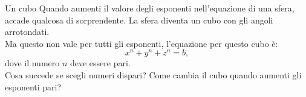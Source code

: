 \begin{surferPage}[Cubo]{Un cubo}
Quando aumenti il valore degli esponenti nell'equazione di una sfera, accade qualcosa di sorprendente. La sfera diventa un cubo con gli angoli arrotondati.\\
\vspace{0.3cm}
Ma questo non vale per tutti gli esponenti, l'equazione per questo cubo \`e:
\[x^n+y^n+z^n=b,\]
dove il numero $n$ deve essere pari.\\
\vspace{0.3cm}
Cosa succede se scegli numeri dispari? Come cambia il cubo quando aumenti  gli esponenti pari?
\end{surferPage}
